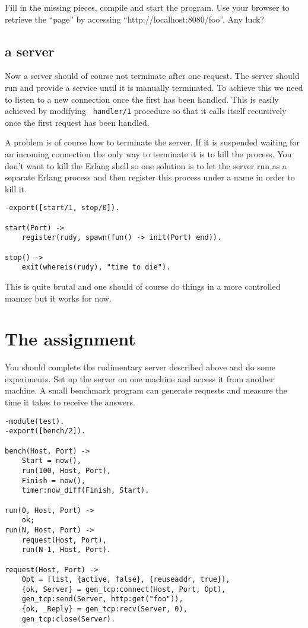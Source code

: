 \documentclass[a4paper,11pt]{article}
\begin{document}
Fill in the missing pieces, compile and start the program. Use your
browser to retrieve the ``page'' by accessing
``http://localhost:8080/foo''. Any luck?

\subsection{a server}

Now a server should of course not terminate after one request. The
server should run and provide a service until it is manually
terminated. To achieve this we need to listen to a new connection once
the first has been handled. This is easily achieved by modifying {\tt
  handler/1} procedure so that it calls itself recursively once the
first request has been handled.

A problem is of course how to terminate the server. If it is suspended
waiting for an incoming connection the only way to terminate it is to
kill the process. You don't want to kill the Erlang shell so one
solution is to let the server run as a separate Erlang process and then
register this process under a name in order to kill it.

\begin{verbatim}
-export([start/1, stop/0]).

start(Port) ->
    register(rudy, spawn(fun() -> init(Port) end)).

stop() ->
    exit(whereis(rudy), "time to die").
\end{verbatim}    

This is quite brutal and one should of course do things in a more
controlled manner but it works for now.

\section{The assignment}

You should complete the rudimentary server described above and do some
experiments. Set up the server on one machine and access it from
another machine. A small benchmark program can generate requests
and measure the time it takes to receive the answers.

\begin{verbatim}
-module(test).
-export([bench/2]).

bench(Host, Port) ->
    Start = now(),
    run(100, Host, Port),
    Finish = now(),
    timer:now_diff(Finish, Start).

run(0, Host, Port) ->
    ok;
run(N, Host, Port) ->
    request(Host, Port),
    run(N-1, Host, Port).

request(Host, Port) ->
    Opt = [list, {active, false}, {reuseaddr, true}],
    {ok, Server} = gen_tcp:connect(Host, Port, Opt),
    gen_tcp:send(Server, http:get("foo")),
    {ok, _Reply} = gen_tcp:recv(Server, 0),
    gen_tcp:close(Server).
\end{verbatim}
\end{document}
